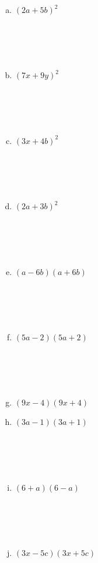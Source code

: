 \documentclass[a4paper,14pt]{article}
\begin{document}
\begin{multicols}{2}
\begin{enumerate}
\begin{enumerate}[a)]
    			\item $(2a + 5b)^2$ \\\\\\\\\\
    			\item $(7x + 9y)^2$ \\\\\\\\\\
    			\item $(3x + 4b)^2$ \\\\\\\\\\
    			\item $(2a + 3b)^2$ \\\\\\\\\\
    			\item $(a - 6b)(a + 6b)$ \\\\\\\\\\
    			\item $(5a - 2)(5a + 2)$ \\\\\\\\\\
    			\item $(9x - 4)(9x + 4)$ \newpage
    			\item $(3a - 1)(3a + 1)$ \\\\\\\\\\
    			\item $(6 + a)(6 - a)$ \\\\\\\\\\
    			\item $(3x - 5c)(3x + 5c)$ \\\\\\\\\\

\end{enumerate}
\end{enumerate}
\end{multicols}
\end{document}
